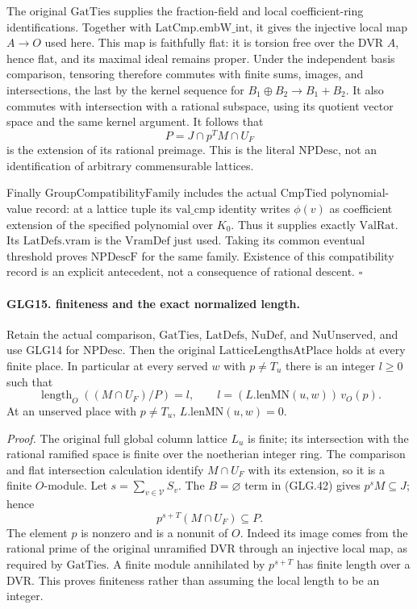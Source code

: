 The original \(\mathrm{GatTies}\) supplies the fraction-field
and local coefficient-ring identifications. Together with
\(\mathrm{LatCmp.embW\_int}\), it gives the injective local
map \(A\to O\) used here. This map is faithfully flat:
it is torsion free over the DVR \(A\), hence flat, and
its maximal ideal remains proper. Under the independent
basis comparison, tensoring therefore commutes with
finite sums, images, and intersections, the last by
the kernel sequence for \(B_1\oplus B_2\to B_1+B_2\).
It also commutes with intersection with a rational
subspace, using its quotient vector space and the same
kernel argument. It follows that
\[
                   P=J\cap p^TM\cap U_F
 \]
is the extension of its rational preimage. This is the
literal \(\mathrm{NPDesc}\), not an identification of
arbitrary commensurable lattices.

Finally \(\mathrm{GroupCompatibilityFamily}\) includes
the actual \(\mathrm{CmpTied}\) polynomial-value record:
at a lattice tuple its \(\mathrm{val\_cmp}\) identity
writes \(\phi(v)\) as coefficient extension of the
specified polynomial over \(K_0\). Thus it supplies
exactly \(\mathrm{ValRat}\). Its \(\mathrm{LatDefs.vram}\)
is the \(\mathrm{VramDef}\) just used. Taking its common
eventual threshold proves \(\mathrm{NPDescF}\) for the
same family. Existence of this compatibility record is
an explicit antecedent, not a consequence of rational
descent.
\hfill\(\square\)

\paragraph{GLG15. finiteness and the exact normalized length.}
\label{claim:GLG15}
Retain the actual comparison, \(\mathrm{GatTies}\),
\(\mathrm{LatDefs}\), \(\mathrm{NuDef}\), and
\(\mathrm{NuUnserved}\), and use GLG14 for \(\mathrm{NPDesc}\).
Then the original \(\mathrm{LatticeLengthsAtPlace}\)
holds at every finite place. In particular at every
served \(w\) with \(p\ne T_u\) there is an integer \(l\ge0\)
such that
\[
 \operatorname{length}_O((M\cap U_F)/P)=l,\qquad
              l=(L.\mathrm{lenMN}(u,w))\,v_O(p).                 \tag{GLG.43}
\]
At an unserved place with \(p\ne T_u\),
\(L.\mathrm{lenMN}(u,w)=0\).

\emph{Proof.}
The original full global column lattice \(L_u\) is finite;
its intersection with the rational ramified space is
finite over the noetherian integer ring. The comparison
and flat intersection calculation identify \(M\cap U_F\)
with its extension, so it is a finite \(O\)-module.
Let \(s=\sum_{v\in\mathcal V}S_v\). The \(B=\varnothing\)
term in (GLG.42) gives \(p^sM\subseteq J\); hence
\[
                  p^{s+T}(M\cap U_F)\subseteq P .                \tag{GLG.44}
\]
The element \(p\) is nonzero and is a nonunit of \(O\).
Indeed its image comes from the rational prime of the
original unramified DVR through an injective local map,
as required by \(\mathrm{GatTies}\). A finite module
annihilated by \(p^{s+T}\) has finite length over a DVR.
This proves finiteness rather than assuming the local
length to be an integer.

